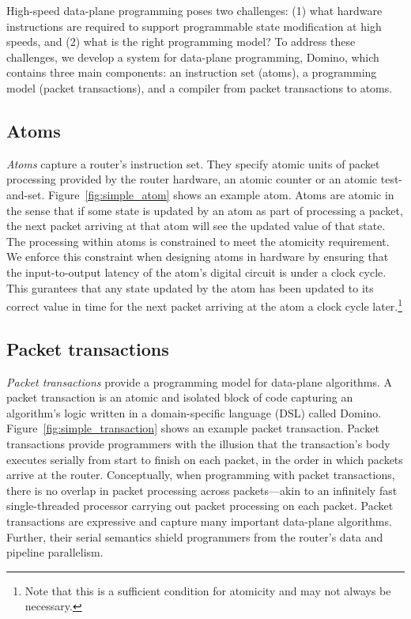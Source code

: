 High-speed data-plane programming poses two challenges: (1) what hardware
instructions are required to support programmable state modification at high
speeds, and (2) what is the right programming model? To address these
challenges, we develop a system for data-plane programming, Domino, which
contains three main components: an instruction set (atoms), a programming model
(packet transactions), and a compiler from packet transactions to atoms.

\subsection{Atoms}
\label{ss:intro_atoms}
\textit{Atoms} capture a router's instruction set. They specify atomic units of
packet processing provided by the router hardware, \eg an atomic counter or an
atomic test-and-set. Figure~\ref{fig:simple_atom} shows an example atom. Atoms
are atomic in the sense that if some state is updated by an atom as part of
processing a packet, the next packet arriving at that atom will see the updated
value of that state. The processing within atoms is constrained to meet the
atomicity requirement. We enforce this constraint when designing atoms in
hardware by ensuring  that the input-to-output latency of the atom's digital
circuit is under a clock cycle. This gurantees that any state updated by the
atom has been updated to its correct value in time for the next packet arriving
at the atom a clock cycle later.\footnote{Note that this is a sufficient
condition for atomicity and may not always be necessary.}

\subsection{Packet transactions} \textit{Packet transactions} provide a
programming model for data-plane algorithms. A packet transaction is an atomic
and isolated block of code capturing an algorithm's logic written in a
domain-specific language (DSL) called Domino.
Figure~\ref{fig:simple_transaction} shows an example packet transaction.
Packet transactions provide programmers with the illusion that the
transaction's body executes serially from start to finish on each packet, in
the order in which packets arrive at the router. Conceptually, when programming
with packet transactions, there is no overlap in packet processing across
packets---akin to an infinitely fast single-threaded processor carrying out
packet processing on each packet. Packet transactions are expressive and
capture many important data-plane algorithms.  Further, their serial semantics
shield programmers from the router's data and pipeline parallelism.

